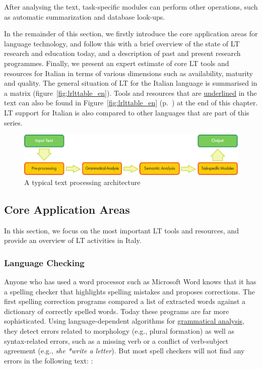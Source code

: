 \documentclass[]{../../metanetpaper}
\begin{document}
\begin{multicols}{2}
After analysing the text, task-specific modules can perform other operations,
such as automatic summarization and database look-ups.

In the remainder of this section, we firstly introduce the core application
areas for language technology, and follow this with a brief overview of the
state of LT research and education today, and a description of past and
present research programmes. Finally, we present an expert estimate of core LT
tools and resources for Italian in terms of various dimensions such as
availability, maturity and quality. The general situation of LT for the Italian
language is summarised in a matrix (figure~\ref{fig:lrlttable_en}). Tools and
resources that are \underline{underlined} in the text can also be found in
Figure~\ref{fig:lrlttable_en} (p.~\pageref{fig:lrlttable_en}) at the end of
this chapter. LT support for Italian is also compared to other languages that
are part of this series.



\begin{figure}[htb]
  \center
  \includegraphics[width=\textwidth]{../_media/english/text_processing_app_architecture}
  \caption{A typical text processing architecture}
  \label{fig:textprocessingarch_en}
\end{figure}



\subsection{Core Application Areas}

In this section, we focus on the most important LT tools and resources, and
provide an overview of LT activities in Italy. 



\subsubsection{Language Checking}


Anyone who has used a word processor such as Microsoft Word knows that it has a spelling checker that highlights spelling mistakes and proposes corrections. The first spelling correction programs compared a list of extracted words against a dictionary of correctly spelled words. Today these programs are far more sophisticated. Using language-dependent algorithms for \underline{grammatical analysis}, they detect errors related to morphology (e.g., plural formation) as well as syntax-related errors, such as a missing verb or a conflict of verb-subject agreement (e.g., \emph{she *write a letter}). But most spell checkers will not find any errors in the following text: \cite{zar1}:


\end{multicols}
\end{document}
